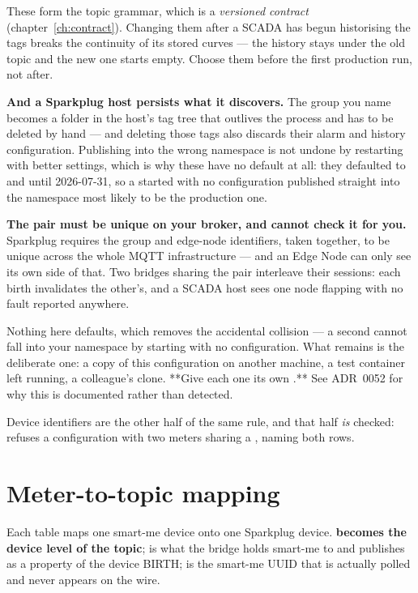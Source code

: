 \begin{warning}
These form the topic grammar, which is a \emph{versioned contract} (chapter~\ref{ch:contract}).
Changing them after a SCADA has begun historising the tags breaks the continuity of its
stored curves --- the history stays under the old topic and the new one starts empty.
Choose them before the first production run, not after.

\textbf{And a Sparkplug host persists what it discovers.} The group you name becomes a
folder in the host's tag tree that outlives the process and has to be deleted by hand ---
and deleting those tags also discards their alarm and history configuration. Publishing
into the wrong namespace is not undone by restarting with better settings, which is why
these have no default at all: they defaulted to  and  until
2026-07-31, so a \prog started with no configuration published straight into the namespace
most likely to be the production one.
\end{warning}

\begin{warning}
\textbf{The pair must be unique on your broker, and \prog cannot check it for you.} Sparkplug
requires the group and edge-node identifiers, taken together, to be unique across the whole MQTT
infrastructure --- and an Edge Node can only see its own side of that. Two bridges sharing the pair
interleave their sessions: each birth invalidates the other's, and a SCADA host sees one node
flapping with no fault reported anywhere.

Nothing here defaults, which removes the accidental collision --- a second \prog cannot fall into
your namespace by starting with no configuration. What remains is the deliberate one: a copy of this
configuration on another machine, a test container left running, a colleague's clone. **Give each
one its own .** See ADR~0052 for why this is documented rather than detected.

Device identifiers are the other half of the same rule, and that half \emph{is} checked:
\prog refuses a configuration with two meters sharing a , naming both rows.
\end{warning}

\section{Meter-to-topic mapping}
Each \code{[[meters]]} table maps one smart-me device onto one Sparkplug device.
\textbf{ becomes the device level of the topic};  is what the
bridge holds smart-me to and publishes as a property of the device BIRTH;  is
the smart-me UUID that is actually polled and never appears on the wire.

